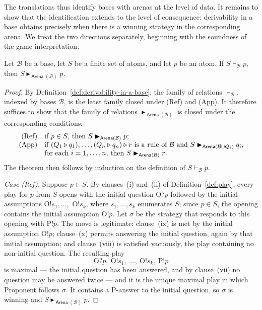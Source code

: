 \documentclass{lipics-v2021}
\newcommand{\deriv}[1]{\vdash_{#1}}       %
\newcommand{\supp}[1]{\Vdash_{#1}}
\newcommand{\wstrat}[1]{\blacktriangleright_{#1}}            %
\newcommand{\base}[1]{\mathcal{#1}}                    %
\newcommand{\brule}[1]{\triangleright{#1}}         %
\newcommand{\toarena}[1]{\mathrel{\textsf{Arena}}(#1)}           %
\begin{document}
The translations thus identify bases with arenas at the level of data. It
remains to show that the identification extends to the level of consequence:
derivability in a base obtains precisely when there is a winning strategy in
the corresponding arena. We treat the two directions separately, beginning
with the soundness of the game interpretation.
\begin{theorem}
\label{thm:game-soundness}
    Let $\base{B}$ be a base, let $S$ be a finite set of atoms, and let $p$
    be an atom. If $S \deriv{\base{B}} p$, then
    $S \wstrat{\toarena{\base{B}}} p$.
\end{theorem}
\begin{proof}
By Definition~\ref{def:derivability-in-a-base}, the family of relations
$\deriv{\base{B}}$, indexed by bases $\base{B}$, is the least family closed
under (Ref) and (App). It therefore suffices to show that the family of
relations $\wstrat{\toarena{\base{B}}}$ is closed under the corresponding
conditions:
\[
\begin{array}{rl}
    \mbox{\rm (Ref)} & \mbox{if $p \in S$, then $S \wstrat{\toarena{\base{B}}} p$;} \\
    \mbox{\rm (App)} & \mbox{if $(Q_1 \brule q_1), \ldots, (Q_n \brule q_n)
        \brule r$ is a rule of $\base{B}$ and
        $S \wstrat{\toarena{\base{B} \cup Q_i}} q_i$,} \\
        & \mbox{for each $i = 1, \ldots, n$, then $S \wstrat{\toarena{\base{B}}} r$.}
\end{array}
\]
The theorem then follows by induction on the definition of
$S \deriv{\base{B}} p$.
 
\medskip
 
\noindent\emph{Case (Ref).} Suppose $p \in S$. By clauses~(i) and~(ii) of
Definition~\ref{def:play}, every play for $p$ from $S$ opens with the initial
question O?$p$ followed by the initial assumptions O!$s_1, \ldots,$ O!$s_k$,
where $s_1, \ldots, s_k$ enumerates $S$; since $p \in S$, the opening contains
the initial assumption O!$p$. Let $\sigma$ be the strategy that responds to
this opening with P!$p$. The move is legitimate: clause~(ix) is met by the
initial assumption O!$p$; clause~(x) permits answering the initial question,
again by that initial assumption; and clause~(viii) is satisfied vacuously,
the play containing no non-initial question. The resulting play
\[
\text{O?}p,\ \text{O!}s_1,\ \ldots,\ \text{O!}s_k,\ \text{P!}p
\]
is maximal --- the initial question has been answered, and by clause~(vii) no
question may be answered twice --- and it is the unique maximal play in which
Proponent follows $\sigma$. It contains a P-answer to the initial question,
so $\sigma$ is winning and $S \wstrat{\toarena{\base{B}}} p$.
 

\end{proof}
\end{document}
